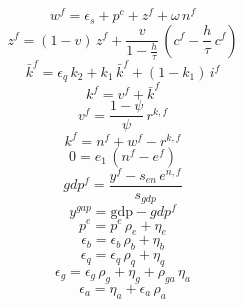 \begin{dmath}
{{w^{f}}}={{\epsilon_{s}}}+{{p^{c}}}+{{z^{f}}}+{{\omega}}\, {{n^{f}}}
\end{dmath}
\begin{dmath}
{{z^{f}}}=\left(1-{{v}}\right)\, {{z^{f}}}+\frac{{{v}}}{1-\frac{{{h}}}{{{\tau}}}}\, \left({{c^{f}}}-\frac{{{h}}}{{{\tau}}}\, {{c^{f}}}\right)
\end{dmath}
\begin{dmath}
{{\bar{k}^{f}}}={{\epsilon_{q}}}\, {{k_{2}}}+{{k_{1}}}\, {{\bar{k}^{f}}}+\left(1-{{k_{1}}}\right)\, {{i^{f}}}
\end{dmath}
\begin{dmath}
{{k^{f}}}={{v^{f}}}+{{\bar{k}^{f}}}
\end{dmath}
\begin{dmath}
{{v^{f}}}=\frac{1-{{\psi}}}{{{\psi}}}\, {{r^{k,f}}}
\end{dmath}
\begin{dmath}
{{k^{f}}}={{n^{f}}}+{{w^{f}}}-{{r^{k,f}}}
\end{dmath}
\begin{dmath}
0={{e_{1}}}\, \left({{n^{f}}}-{{e^{f}}}\right)
\end{dmath}
\begin{dmath}
{{gdp^{f}}}=\frac{{{y^{f}}}-{{s_{en}}}\, {{e^{n,f}}}}{{{s_{gdp}}}}
\end{dmath}
\begin{dmath}
{{y^{gap}}}={{\mathrm{gdp}}}-{{gdp^{f}}}
\end{dmath}
\begin{dmath}
{{p^{e}}}={{p^{e}}}\, {{\rho_{e}}}+{{\eta_{e}}}
\end{dmath}
\begin{dmath}
{{\epsilon_{b}}}={{\epsilon_{b}}}\, {{\rho_{b}}}+{{\eta_{b}}}
\end{dmath}
\begin{dmath}
{{\epsilon_{q}}}={{\epsilon_{q}}}\, {{\rho_{q}}}+{{\eta_{q}}}
\end{dmath}
\begin{dmath}
{{\epsilon_{g}}}={{\epsilon_{g}}}\, {{\rho_{g}}}+{{\eta_{g}}}+{{\rho_{ga}}}\, {{\eta_{a}}}
\end{dmath}
\begin{dmath}
{{\epsilon_{a}}}={{\eta_{a}}}+{{\epsilon_{a}}}\, {{\rho_{a}}}
\end{dmath}
